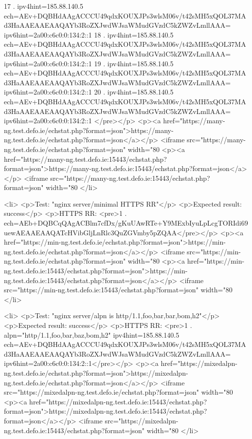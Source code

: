 17 . ipv4hint=185.88.140.5 ech=AEv+DQBHdAAgACCCU49qdxKOUXJPs3wlsM06v/t42sMH5xQOL37MAd3HaAAEAAEAAQAYb3RoZXJwdWJsaWMudGVzdC5kZWZvLmllAAA= ipv6hint=2a00:c6c0:0:134:2::1
18 . ipv4hint=185.88.140.5 ech=AEv+DQBHdAAgACCCU49qdxKOUXJPs3wlsM06v/t42sMH5xQOL37MAd3HaAAEAAEAAQAYb3RoZXJwdWJsaWMudGVzdC5kZWZvLmllAAA= ipv6hint=2a00:c6c0:0:134:2::1
19 . ipv4hint=185.88.140.5 ech=AEv+DQBHdAAgACCCU49qdxKOUXJPs3wlsM06v/t42sMH5xQOL37MAd3HaAAEAAEAAQAYb3RoZXJwdWJsaWMudGVzdC5kZWZvLmllAAA= ipv6hint=2a00:c6c0:0:134:2::1
20 . ipv4hint=185.88.140.5 ech=AEv+DQBHdAAgACCCU49qdxKOUXJPs3wlsM06v/t42sMH5xQOL37MAd3HaAAEAAEAAQAYb3RoZXJwdWJsaWMudGVzdC5kZWZvLmllAAA= ipv6hint=2a00:c6c0:0:134:2::1
</pre></p>
<p><a href="https://many-ng.test.defo.ie/echstat.php?format=json">https://many-ng.test.defo.ie/echstat.php?format=json</a></p>
<iframe src="https://many-ng.test.defo.ie/echstat.php?format=json" width="80%
<p><a href="https://many-ng.test.defo.ie:15443/echstat.php?format=json">https://many-ng.test.defo.ie:15443/echstat.php?format=json</a></p>
<iframe src="https://many-ng.test.defo.ie:15443/echstat.php?format=json" width="80%
</li>

<li>
<p>Test: "nginx server/minimal HTTPS RR"</p>
<p>Expected result: success</p>
<p>HTTPS RR: <pre>1 . ech=AEb+DQBCqQAgACBlm7cfDx/gKuUAwRTe+Y9MExbIyuLpLcgTORIdi69uewAEAAEAAQATcHVibGljLnRlc3QuZGVmby5pZQAA</pre></p>
<p><a href="https://min-ng.test.defo.ie/echstat.php?format=json">https://min-ng.test.defo.ie/echstat.php?format=json</a></p>
<iframe src="https://min-ng.test.defo.ie/echstat.php?format=json" width="80%
<p><a href="https://min-ng.test.defo.ie:15443/echstat.php?format=json">https://min-ng.test.defo.ie:15443/echstat.php?format=json</a></p>
<iframe src="https://min-ng.test.defo.ie:15443/echstat.php?format=json" width="80%
</li>

<li>
<p>Test: "nginx server/alpn is http/1.1,foo,bar,bar,bom,h2"</p>
<p>Expected result: success</p>
<p>HTTPS RR: <pre>1 . alpn="http/1.1,foo,bar,baz,bom,h2" ipv4hint=185.88.140.5 ech=AEv+DQBHdAAgACCCU49qdxKOUXJPs3wlsM06v/t42sMH5xQOL37MAd3HaAAEAAEAAQAYb3RoZXJwdWJsaWMudGVzdC5kZWZvLmllAAA= ipv6hint=2a00:c6c0:0:134:2::1</pre></p>
<p><a href="https://mixedalpn-ng.test.defo.ie/echstat.php?format=json">https://mixedalpn-ng.test.defo.ie/echstat.php?format=json</a></p>
<iframe src="https://mixedalpn-ng.test.defo.ie/echstat.php?format=json" width="80%
<p><a href="https://mixedalpn-ng.test.defo.ie:15443/echstat.php?format=json">https://mixedalpn-ng.test.defo.ie:15443/echstat.php?format=json</a></p>
<iframe src="https://mixedalpn-ng.test.defo.ie:15443/echstat.php?format=json" width="80%
</li>

